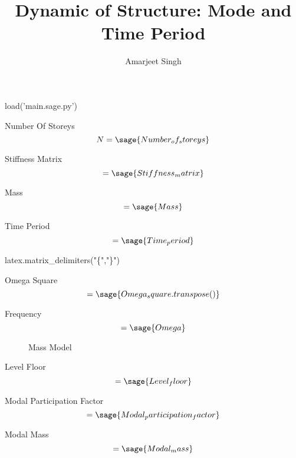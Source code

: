 \documentclass[12pt]{report}
\title{Dynamic of Structure: Mode and Time Period}
\author{Amarjeet Singh }
\begin{document}
\thispagestyle{plain}
	\begin{titlepage}
\maketitle
	\end{titlepage}

\begin{sagesilent}
	load('main.sage.py')
	
\end{sagesilent}

Number Of Storeys
\begin{equation}
	N = \sage{Number_of_storeys}
\end{equation}

Stiffness Matrix
\begin{equation}
	[K]=\sage{Stiffness_matrix}
\end{equation}

Mass
\begin{equation}
	 [M]=\sage{Mass}
\end{equation}

Time Period
\begin{equation}
	[T]=\sage{Time_period}
\end{equation}

\begin{sagesilent}
latex.matrix_delimiters("\{","\}")
\end{sagesilent}

Omega Square
\begin{equation}
	[\omega^2] =\sage{Omega_square.transpose()}
\end{equation}

Frequency
\begin{equation}
	[\omega]=\sage{Omega}
\end{equation}

\begin{figure}
	\caption{Mass Model}
\end{figure}

Level Floor
\begin{equation}
	[L]=\sage{Level_floor}
\end{equation}

Modal Participation Factor
\begin{equation}
	 [p]=\sage{Modal_participation_factor}
\end{equation}

Modal Mass
\begin{equation}
	 [M_{{m}}]=\sage{Modal_mass}
\end{equation}
\end{document}
